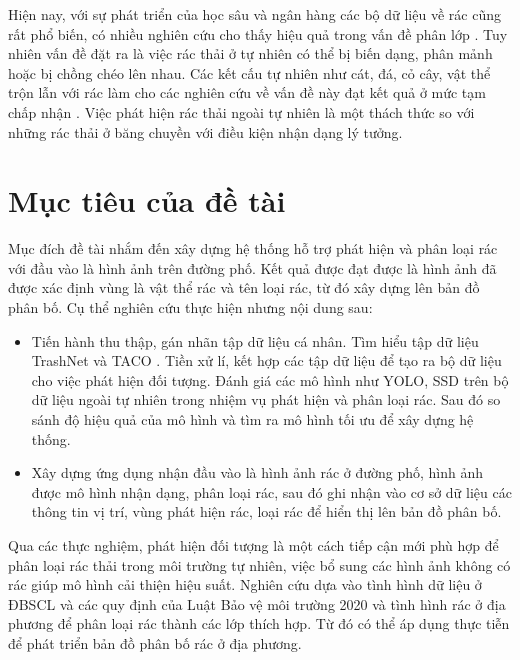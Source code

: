 \documentclass[../the.tex]{subfiles}
\begin{document}
\bigskip

{\fontsize{13}{12} \selectfont 

Hiện nay, với sự phát triển của học sâu và ngân hàng các bộ dữ liệu về rác cũng rất phổ biến, có nhiều nghiên cứu cho thấy hiệu quả trong vấn đề phân lớp \cite{yang2016classification} \cite{shah2022method} \cite{ahmad2020intelligent}. 
Tuy nhiên vấn đề đặt ra là việc rác thải ở tự nhiên có thể bị biến dạng, phân mảnh hoặc bị chồng chéo lên nhau.
Các kết cấu tự nhiên như cát, đá, cỏ cây, vật thể trộn lẫn với rác làm cho các nghiên cứu về vấn đề này đạt kết quả ở mức tạm chấp nhận \cite{Majchrowska_2022} \cite{9122693} \cite{8793975} \cite{proença2020taco}.
Việc phát hiện rác thải ngoài tự nhiên là một thách thức so với những rác thải ở băng chuyền với điều kiện nhận dạng lý tưởng.

}


\section{Mục tiêu của đề tài}
\label{muc_tieu}


{\fontsize{13}{12} \selectfont

Mục đích đề tài nhắm đến xây dựng hệ thống hỗ trợ phát hiện và phân loại rác với đầu vào là hình ảnh trên đường phố. Kết quả được đạt được là hình ảnh đã được xác định vùng là vật thể rác và tên loại rác, từ đó xây dựng lên bản đồ phân bố. Cụ thể nghiên cứu thực hiện nhưng nội dung sau:

\begin{itemize}
  \item Tiến hành thu thập, gán nhãn tập dữ liệu cá nhân. Tìm hiểu tập dữ liệu TrashNet \cite{yang2016classification} và TACO \cite{proença2020taco}. Tiền xử lí, kết hợp các tập dữ liệu để tạo ra bộ dữ liệu cho việc phát hiện đối tượng.
  Đánh giá các mô hình như YOLO, SSD trên bộ dữ liệu ngoài tự nhiên trong nhiệm vụ phát hiện và phân loại rác. Sau đó so sánh độ hiệu quả của mô hình và tìm ra mô hình tối ưu để xây dựng hệ thống.
  
  \item Xây dựng ứng dụng nhận đầu vào là hình ảnh rác ở đường phố, hình ảnh được mô hình nhận dạng, phân loại rác, sau đó ghi nhận vào cơ sở dữ liệu các thông tin vị trí, vùng phát hiện rác, loại rác để hiển thị lên bản đồ phân bố.
 
\end{itemize}

}
\bigskip

{\fontsize{13}{12} \selectfont

Qua các thực nghiệm, phát hiện đối tượng là một cách tiếp cận mới phù hợp để phân loại rác thải trong môi trường tự nhiên, việc bổ sung các hình ảnh không có rác giúp mô hình cải thiện hiệu suất. Nghiên cứu dựa vào tình hình dữ liệu ở ĐBSCL và các quy định của Luật Bảo vệ môi trường 2020 và tình hình rác ở địa phương để phân loại rác thành các lớp thích hợp. Từ đó có thể áp dụng thực tiễn để phát triển bản đồ phân bố rác ở địa phương. 

}
\end{document}
